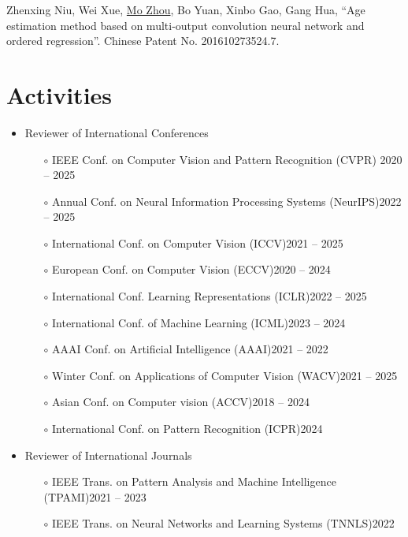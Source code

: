 \documentclass[10pt,margin,line,pifont,palatino,courier]{res}
\begin{document}
\begin{resume}
\begin{enumerate}[noitemsep, leftmargin=*, label={[P0{\arabic*}]}]
\item Zhenxing Niu, Wei Xue, \underline{Mo Zhou}, Bo Yuan, Xinbo Gao, Gang Hua,
    ``Age estimation method based on multi-output convolution neural
    network and ordered regression''. Chinese Patent No. 201610273524.7.

\end{enumerate}

\section{\sc Activities}

\begin{itemize}[leftmargin=*]
\item Reviewer of International Conferences
    \begin{itemize}[noitemsep, leftmargin=*]
        \item[$\circ$] IEEE Conf. on Computer Vision and Pattern Recognition (CVPR) \hfill 2020 -- 2025
        \item[$\circ$] Annual Conf. on Neural Information Processing Systems (NeurIPS)\hfill 2022 -- 2025
        \item[$\circ$] International Conf. on Computer Vision (ICCV)\hfill 2021 -- 2025
        \item[$\circ$] European Conf. on Computer Vision (ECCV)\hfill 2020 -- 2024
        \item[$\circ$] International Conf. Learning Representations (ICLR)\hfill 2022 -- 2025
        \item[$\circ$] International Conf. of Machine Learning (ICML)\hfill 2023 -- 2024
        \item[$\circ$] AAAI Conf. on Artificial Intelligence (AAAI)\hfill 2021 -- 2022
        \item[$\circ$] Winter Conf. on Applications of Computer Vision (WACV)\hfill 2021 -- 2025
        \item[$\circ$] Asian Conf. on Computer vision (ACCV)\hfill 2018 -- 2024
        \item[$\circ$] International Conf. on Pattern Recognition (ICPR)\hfill 2024
    \end{itemize}
\item Reviewer of International Journals
    \begin{itemize}[noitemsep, leftmargin=*]
        \item[$\circ$] IEEE Trans. on Pattern Analysis and Machine Intelligence (TPAMI)\hfill 2021 -- 2023
        \item[$\circ$] IEEE Trans. on Neural Networks and Learning Systems (TNNLS)\hfill 2022

\end{itemize}
\end{itemize}
\end{resume}
\end{document}
